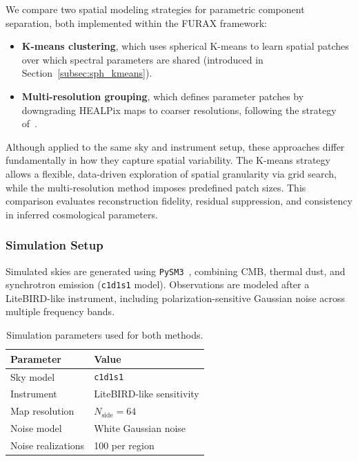 \documentclass[%
 reprint,
bibnotes,
 amsmath,amssymb,
 aps,
floatfix, 
]{revtex4-2}
\begin{document}
We compare two spatial modeling strategies for parametric component separation, both implemented within the \textsc{FURAX} framework:
\begin{itemize}
    \item \textbf{K-means clustering}, which uses spherical K-means to learn spatial patches over which spectral parameters are shared (introduced in Section~\ref{subsec:sph_kmeans}).
    \item \textbf{Multi-resolution grouping}, which defines parameter patches by downgrading HEALPix maps to coarser resolutions, following the strategy of~\citep{LiteBIRD_PTEP_2022}.
\end{itemize}

Although applied to the same sky and instrument setup, these approaches differ fundamentally in how they capture spatial variability. The K-means strategy allows a flexible, data-driven exploration of spatial granularity via grid search, while the multi-resolution method imposes predefined patch sizes. This comparison evaluates reconstruction fidelity, residual suppression, and consistency in inferred cosmological parameters.

\subsubsection*{Simulation Setup}

Simulated skies are generated using \texttt{PySM3}~\citep{Panexp_2025,Zonca_2021,Thorne_2017}, combining CMB, thermal dust, and synchrotron emission (\texttt{c1d1s1} model). Observations are modeled after a LiteBIRD-like instrument, including polarization-sensitive Gaussian noise across multiple frequency bands.

\begin{table}[h]
    \centering
    \small
    \caption{Simulation parameters used for both methods.}
    \begin{tabular}{@{}p{3.5cm}|p{5cm}@{}}
        \toprule
        \textbf{Parameter} & \textbf{Value} \\
        \midrule
        Sky model & \texttt{c1d1s1} \\
        Instrument & LiteBIRD-like sensitivity \\
        Map resolution & \( N_{\text{side}} = 64 \) \\
        Noise model & White Gaussian noise \\
        Noise realizations & 100 per region \\
        \bottomrule
    \end{tabular}
    \label{tab:comparison_sim}
\end{table}
\end{document}
